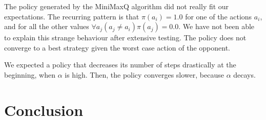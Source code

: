 \documentclass{article}
\begin{document}
The policy generated by the MiniMaxQ algorithm did not really fit our expectations. The recurring pattern is that $\pi(a_i) = 1.0$ for one of the actions $a_i$, and for all the other values $\forall a_j (a_j \neq a_i) \pi(a_j) = 0.0$. We have not been able to explain this strange behaviour after extensive testing. The policy does not converge to a best strategy given the worst case action of the opponent.

We expected a policy that decreases its number of steps drastically at the beginning, when $\alpha$ is high. Then, the policy converges slower, because $\alpha$ decays. %
\section{Conclusion}
\end{document}
